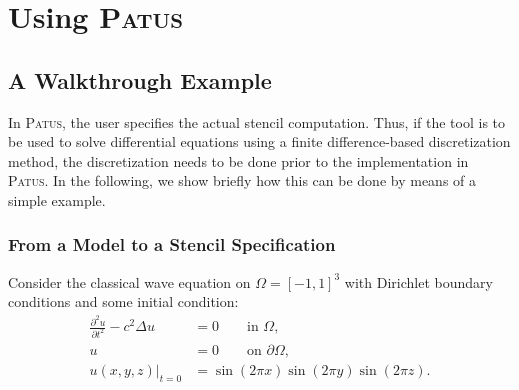\section{Using \textsc{Patus}}

\subsection{A Walkthrough Example}

In \textsc{Patus}, the user specifies the actual stencil computation.
Thus, if the tool is to be used to solve differential equations using a finite difference-based
discretization method, the discretization needs to be done prior to the implementation in \textsc{Patus}.
In the following, we show briefly how this can be done by means of a simple example.


\subsubsection{From a Model to a Stencil Specification}

Consider the classical wave equation on $\Omega=[-1,1]^3$ with Dirichlet boundary conditions and some initial condition:
\begin{align}
  \frac{\partial^2 u}{\partial t^2} - c^2 \Delta u & = 0 \qquad \text{in }\Omega, \nonumber \\
  u & = 0 \qquad \text{on }\partial\Omega, \\
  u(x,y,z)|_{t=0} & = \sin(2\pi x) \sin(2\pi y) \sin (2\pi z). \nonumber
  \label{eq:wave}
\end{align}

